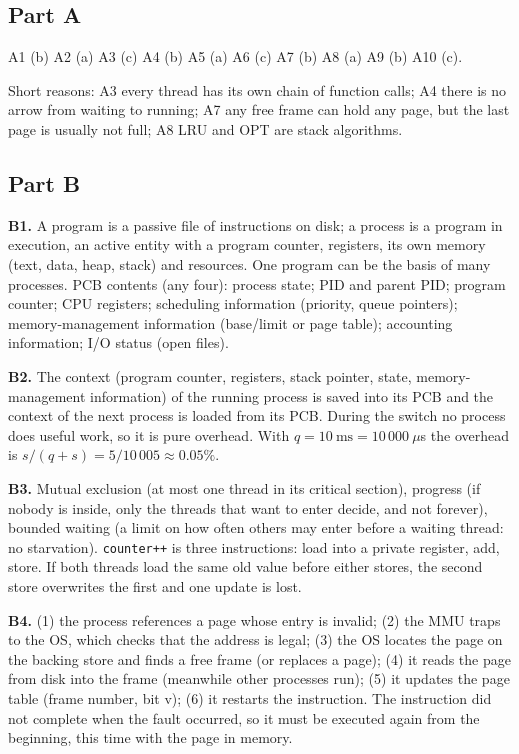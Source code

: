 \documentclass[11pt,a4paper]{article}
\begin{document}
\subsection*{Part A}
A1 (b) \quad A2 (a) \quad A3 (c) \quad A4 (b) \quad A5 (a) \quad A6 (c) \quad A7 (b) \quad A8 (a) \quad A9 (b) \quad A10 (c).

Short reasons: A3 every thread has its own chain of function calls; A4 there is no arrow from waiting to running; A7 any free frame can hold any page, but the last page is usually not full; A8 LRU and OPT are stack algorithms.

\subsection*{Part B}
\textbf{B1.} A program is a passive file of instructions on disk; a process is a program in execution, an active entity with a program counter, registers, its own memory (text, data, heap, stack) and resources. One program can be the basis of many processes. PCB contents (any four): process state; PID and parent PID; program counter; CPU registers; scheduling information (priority, queue pointers); memory-management information (base/limit or page table); accounting information; I/O status (open files).

\textbf{B2.} The context (program counter, registers, stack pointer, state, memory-management information) of the running process is saved into its PCB and the context of the next process is loaded from its PCB. During the switch no process does useful work, so it is pure overhead. With $q = 10\ \text{ms} = 10\,000\ \mu$s the overhead is $s/(q+s) = 5/10\,005 \approx 0.05\%$.

\textbf{B3.} Mutual exclusion (at most one thread in its critical section), progress (if nobody is inside, only the threads that want to enter decide, and not forever), bounded waiting (a limit on how often others may enter before a waiting thread: no starvation). \texttt{counter++} is three instructions: load into a private register, add, store. If both threads load the same old value before either stores, the second store overwrites the first and one update is lost.

\textbf{B4.} (1) the process references a page whose entry is invalid; (2) the MMU traps to the OS, which checks that the address is legal; (3) the OS locates the page on the backing store and finds a free frame (or replaces a page); (4) it reads the page from disk into the frame (meanwhile other processes run); (5) it updates the page table (frame number, bit v); (6) it restarts the instruction. The instruction did not complete when the fault occurred, so it must be executed again from the beginning, this time with the page in memory.
\end{document}
